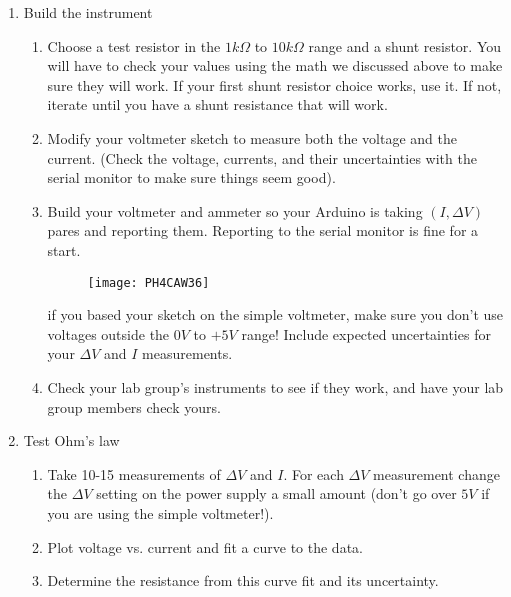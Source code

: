 \begin{enumerate}
\item Build the instrument

\begin{enumerate}
\item Choose a test resistor in the $1\unit{k%
\Omega%
}$ to $10\unit{k%
\Omega%
}$ range and a shunt resistor. You will have to check your values using the
math we discussed above to make sure they will work. If your first shunt
resistor choice works, use it. If not, iterate until you have a shunt
resistance that will work.

\item Modify your voltmeter sketch to measure both the voltage and the
current. (Check the voltage, currents, and their uncertainties with the
serial monitor to make sure things seem good).

\item Build your voltmeter and ammeter so your Arduino is taking $\left(
I,\Delta V\right) $ pares and reporting them. Reporting to the serial
monitor is fine for a start. \begin{figure}[h!]
\texttt{[image: PH4CAW36]}
\end{figure}if you based your sketch on the
simple voltmeter, make sure you don't use voltages outside the $0\unit{V}$
to $+5\unit{V}$ range! Include expected uncertainties for your $\Delta V$
and $I$ measurements.

\item Check your lab group's instruments to see if they work, and have your
lab group members check yours.
\end{enumerate}

\item Test Ohm's law

\begin{enumerate}
\item Take 10-15 measurements of $\Delta V$ and $I.$ For each $\Delta V$
measurement change the $\Delta V$ setting on the power supply a small amount
(don't go over $5\unit{V}$ if you are using the simple voltmeter!).

\item Plot voltage vs. current and fit a curve to the data.

\item Determine the resistance from this curve fit and its uncertainty.


\end{enumerate}
\end{enumerate}
